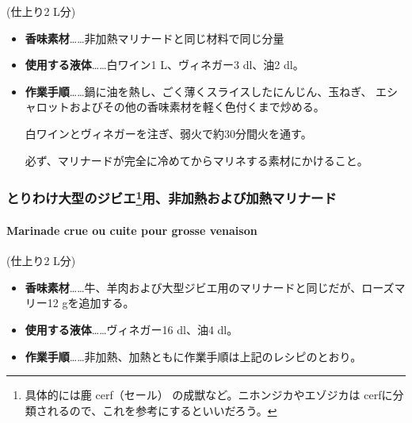 \begin{recette}
(仕上り2 L分)

\begin{itemize}
\item
  \textbf{香味素材}\ldots{}\ldots{}非加熱マリナードと同じ材料で同じ分量
\item
  \textbf{使用する液体}\ldots{}\ldots{}白ワイン1\undemi{} L、ヴィネガー3
  dl、油2\undemi{} dl。
\item
  \textbf{作業手順}\ldots{}\ldots{}鍋に油を熱し、ごく薄くスライスしたにんじん、玉ねぎ、
  エシャロットおよびその他の香味素材を軽く色付くまで炒める。

  白ワインとヴィネガーを注ぎ、弱火で約30分間火を通す。

  必ず、マリナードが完全に冷めてからマリネする素材にかけること。
\end{itemize}

\maeaki

\hypertarget{toriwake-oogatano-jibieyou-hikanetsu-oyobi-kanetsu-marinade}{%
\subsubsection[とりわけ大型のジビエ用、非加熱および加熱マリナード]{\texorpdfstring{とりわけ大型のジビエ\footnote{具体的には鹿
  cerf（セール） の成獣など。ニホンジカやエゾジカは
  cerfに分類されるので、これを参考にするといいだろう。}用、非加熱および加熱マリナード}{とりわけ大型のジビエ用、非加熱および加熱マリナード}}\label{toriwake-oogatano-jibieyou-hikanetsu-oyobi-kanetsu-marinade}}

\hypertarget{marinade-crue-ou-cuite-pour-grosse-venaison}{%
\paragraph{Marinade crue ou cuite pour grosse
venaison}\label{marinade-crue-ou-cuite-pour-grosse-venaison}}


(仕上り2 L分)

\begin{itemize}
\item
  \textbf{香味素材}\ldots{}\ldots{}牛、羊肉および大型ジビエ用のマリナードと同じだが、ローズマリー12
  gを追加する。
\item
  \textbf{使用する液体}\ldots{}\ldots{}ヴィネガー16 dl、油4 dl。
\item
  \textbf{作業手順}\ldots{}\ldots{}非加熱、加熱ともに作業手順は上記のレシピのとおり。
\end{itemize}


\end{recette}
